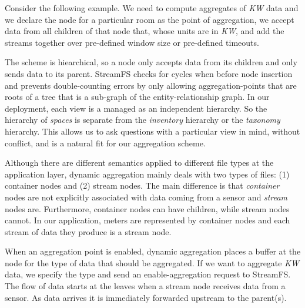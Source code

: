 Consider the following example.  We need to compute aggregates of \emph{KW} data and we declare the node for a particular room as
the point of aggregation, we accept data from all children of that node that, whose units are in \emph{KW},
and add the streams together over pre-defined window size or pre-defined timeouts.

The scheme is hiearchical, so a node only accepts data from its children and only sends data to its parent.
StreamFS checks for cycles when before node insertion and prevents double-counting errors by only allowing 
aggregation-points that are roots of a tree that is a sub-graph of the entity-relationship graph.  In our deployment,
each view is a managed as an independent hierarchy.  So the hierarchy of \emph{spaces} is separate from
the \emph{inventory} hierarchy or the \emph{taxonomy} hierarchy.  This allows us to ask questions with a particular
view in mind, without conflict, and is a natural fit for our aggregation scheme.

Although there are different semantics applied to different file types at the application layer, dynamic aggregation
mainly deals with two types of files: (1) container nodes and (2) stream nodes.  The main difference is that \emph{container} nodes
are not explicitly associated with data coming from a sensor and \emph{stream} nodes are.  Furthermore, container
nodes can have children, while stream nodes cannot.  In our application, meters are represented by container nodes
and each stream of data they produce is a stream node.

When an aggregation point is enabled, dynamic aggregation places a buffer at the node for the type
of data that should be aggregated.  
If we want to aggregate \emph{KW} data, we specify the type and send an enable-aggregation
request to StreamFS.
The flow of data starts at the leaves when
a stream node receives data from a sensor.%
As data arrives it is immediately
forwarded upstream to the parent(s).  

